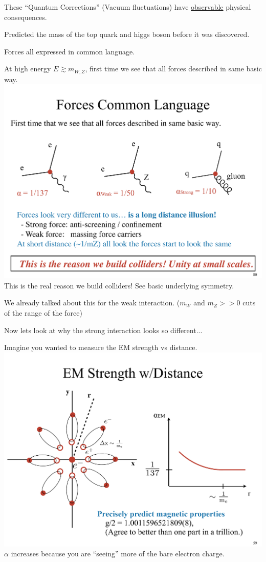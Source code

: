 {These ``Quantum Corrections'' (Vacuum fluctuations) have \underline{observable} physical consequences.


Predicted the mass of the top quark and higgs boson before it was discovered. 

\lineacross

Forces all expressed in common language. 

At high energy $E \gtrsim  m_{W,Z}$, first time we see that all forces described in same basic way.
\bc
\includegraphics[width=1\textwidth]{./ForcesCommon.pdf}
\ec
This is the real reason we build colliders!  See basic underlying symmetry.


We already talked about this for the weak interaction. ($m_W$ and $m_Z >> 0$ cuts of the range of the force) 


Now lets look at why the strong interaction looks so different...

\clearpage

Imagine you wanted to measure the EM strength vs distance. 
\bc
\includegraphics[width=1\textwidth]{./EMStrenghtVsDistance.pdf}
\ec
$\alpha$ increases because you are ``seeing'' more of the bare electron charge.

}
